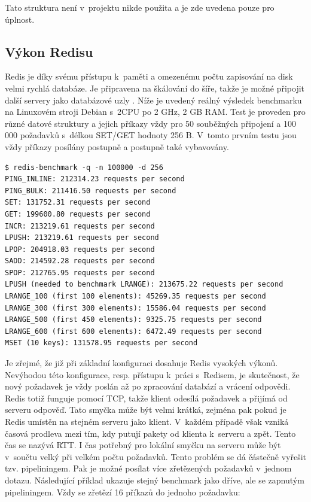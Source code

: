 Tato struktura není v~projektu nikde použita a je zde uvedena pouze pro úplnost.

\subsection{Výkon Redisu}
Redis je díky svému přístupu k~paměti a omezenému počtu zapisování na disk velmi rychlá databáze. Je připravena na škálování do šíře, takže je možné připojit další servery jako databázové uzly \cite{redis-cluster}. Níže je uvedený reálný výsledek benchmarku \cite{redis-benchmark} na Linuxovém stroji Debian s~2\texttimes CPU po 2 GHz, 2 GB RAM. Test je proveden pro různé datové struktury a jejich příkazy vždy pro 50 souběžných připojení a 100 000 požadavků s~délkou SET/GET hodnoty 256 B. V~tomto prvním testu jsou vždy příkazy posílány postupně a postupně také vybavovány.

\begin{verbatim}
$ redis-benchmark -q -n 100000 -d 256
PING_INLINE: 212314.23 requests per second
PING_BULK: 211416.50 requests per second
SET: 131752.31 requests per second
GET: 199600.80 requests per second
INCR: 213219.61 requests per second
LPUSH: 213219.61 requests per second
LPOP: 204918.03 requests per second
SADD: 214592.28 requests per second
SPOP: 212765.95 requests per second
LPUSH (needed to benchmark LRANGE): 213675.22 requests per second
LRANGE_100 (first 100 elements): 45269.35 requests per second
LRANGE_300 (first 300 elements): 15586.04 requests per second
LRANGE_500 (first 450 elements): 9325.75 requests per second
LRANGE_600 (first 600 elements): 6472.49 requests per second
MSET (10 keys): 131578.95 requests per second
\end{verbatim}

Je zřejmé, že již při základní konfiguraci dosahuje Redis vysokých výkonů. Nevýhodou této konfigurace, resp. přístupu k~práci s~Redisem, je skutečnost, že nový požadavek je vždy poslán až po zpracování databází a vrácení odpovědi. Redis totiž funguje pomocí TCP, takže klient odesílá požadavek a přijímá od serveru odpověď. Tato smyčka může být velmi krátká, zejména pak pokud je Redis umístěn na stejném serveru jako klient. V~každém případě však vzniká časová prodleva mezi tím, kdy putují pakety od klienta k~serveru a zpět. Tento čas se nazývá RTT. I čas potřebný pro lokální smyčku na serveru může být v~součtu velký při velkém počtu požadavků. Tento problém se dá částečně vyřešit tzv. pipeliningem. Pak je možné posílat více zřetězených požadavků v~jednom dotazu. Následující příklad ukazuje stejný benchmark jako dříve, ale se zapnutým pipeliningem. Vždy se zřetězí 16 příkazů do jednoho požadavku:

